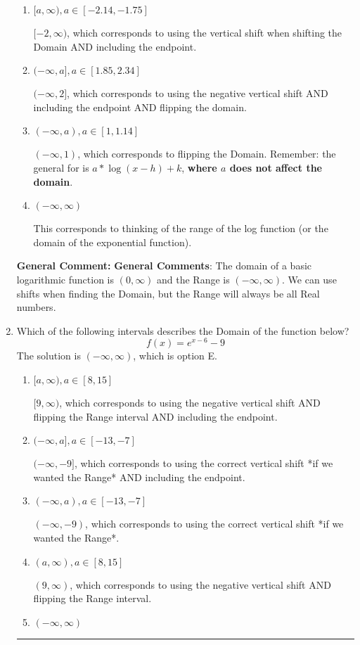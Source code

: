 \documentclass{extbook}[14pt]
\newcommand{\litem}[1]{\item #1

\rule{\textwidth}{0.4pt}}
\begin{document}
\begin{enumerate}
{\begin{enumerate}[label=\Alph*.]
* $(-1, \infty)$, which is the correct option.
\item \( [a, \infty), a \in [-2.14, -1.75] \)

$[-2, \infty)$, which corresponds to using the vertical shift when shifting the Domain AND including the endpoint.
\item \( (-\infty, a], a \in [1.85, 2.34] \)

$(-\infty, 2]$, which corresponds to using the negative vertical shift AND including the endpoint AND flipping the domain.
\item \( (-\infty, a), a \in [1, 1.14] \)

$(-\infty, 1)$, which corresponds to flipping the Domain. Remember: the general for is $a*\log(x-h)+k$, \textbf{where $a$ does not affect the domain}.
\item \( (-\infty, \infty) \)

This corresponds to thinking of the range of the log function (or the domain of the exponential function).
\end{enumerate}

\textbf{General Comment:} \textbf{General Comments}: The domain of a basic logarithmic function is $(0, \infty)$ and the Range is $(-\infty, \infty)$. We can use shifts when finding the Domain, but the Range will always be all Real numbers.
}
\litem{
Which of the following intervals describes the Domain of the function below?
\[ f(x) = e^{x-6}-9 \]The solution is \( (-\infty, \infty) \), which is option E.\begin{enumerate}[label=\Alph*.]
\item \( [a, \infty), a \in [8, 15] \)

$[9, \infty)$, which corresponds to using the negative vertical shift AND flipping the Range interval AND including the endpoint.
\item \( (-\infty, a], a \in [-13, -7] \)

$(-\infty, -9]$, which corresponds to using the correct vertical shift *if we wanted the Range* AND including the endpoint.
\item \( (-\infty, a), a \in [-13, -7] \)

$(-\infty, -9)$, which corresponds to using the correct vertical shift *if we wanted the Range*.
\item \( (a, \infty), a \in [8, 15] \)

$(9, \infty)$, which corresponds to using the negative vertical shift AND flipping the Range interval.
\item \( (-\infty, \infty) \)


\end{enumerate}}
\end{enumerate}
\end{document}
